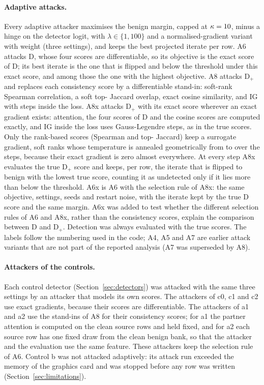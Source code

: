 \paragraph{Adaptive attacks.}
Every adaptive attacker maximises the benign margin, capped at $\kappa = 10$, minus a hinge on the detector
logit, with $\lambda \in \{1, 100\}$ and a normalised-gradient variant with weight \paramNormW{} (three settings), and
keeps the best projected iterate per row.
A6 attacks D, whose four scores are differentiable, so its objective is the exact score of D; its best iterate is the
one that is flipped and below the threshold under this exact score, and among those the one with the highest
objective.
A8 attacks D$_+$ and replaces each consistency score by a differentiable stand-in: soft-rank Spearman correlation, a
soft top-\paramTopK{} Jaccard overlap, exact cosine similarity, and IG with \paramIGLoss{} steps inside the loss.
A8x attacks D$_+$ with its exact score wherever an exact gradient exists: attention, the four scores of D and the
cosine scores are computed exactly, and IG inside the loss uses \axIGSteps{} Gauss-Legendre steps, as in the true
scores.
Only the \nRankScores{} rank-based scores (Spearman and top-\paramTopK{} Jaccard) keep a surrogate gradient, soft
ranks whose temperature is annealed geometrically from \axTauStart{} to \axTauEnd{} over the steps, because their exact
gradient is zero almost everywhere.
At every step A8x evaluates the true D$_+$ score and keeps, per row, the iterate that is flipped to benign with the
lowest true score, counting it as undetected only if it lies more than \axMargin{} below the threshold.
A6x is A6 with the selection rule of A8x: the same objective, settings, seeds and restart noise, with the iterate kept
by the true D score and the same margin.
A6x was added to test whether the different selection rules of A6 and A8x, rather than the consistency scores, explain
the comparison between D and D$_+$.
Detection was always evaluated with the true scores.
The labels follow the numbering used in the code; A4, A5 and A7 are earlier attack variants that are not part of the
reported analysis (A7 was superseded by A8).

\paragraph{Attackers of the controls.}
Each control detector (Section~\ref{sec:detectors}) was attacked with the same three settings by an attacker that
models its own scores.
The attackers of c0, c1 and c2 use exact gradients, because their scores are differentiable.
The attackers of a1 and a2 use the stand-ins of A8 for their \nConsistency{} consistency scores; for a1 the partner
attention is computed on the clean source rows and held fixed, and for a2 each source row has one fixed draw from the
clean benign bank, so that the attacker and the evaluation use the same feature.
These attackers keep the selection rule of A6.
Control b was not attacked adaptively: its attack run exceeded the memory of the graphics card and was stopped before
any row was written (Section~\ref{sec:limitations}).


